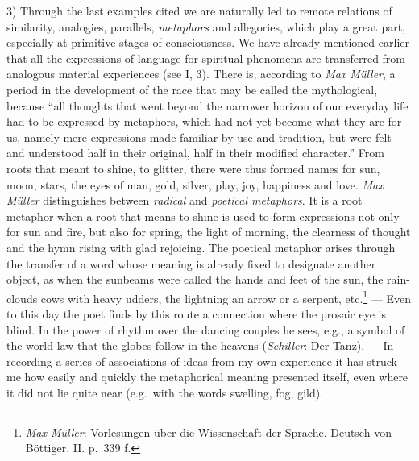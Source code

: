 \documentclass[12pt,a4paper]{book}
\newcommand{\opage}[1]{\marginnote{\footnotesize\textit{[#1]}}}
\begin{document}
3) Through the last examples cited we are naturally led to remote
relations of similarity, analogies, parallels, \emph{metaphors} and
allegories, which play a great part, especially at primitive stages of
consciousness. We have already mentioned earlier that all the expressions
of language for spiritual phenomena are transferred from analogous
material experiences (see I, 3). There is, according to \emph{Max Müller},
a period in the development of the race that may be called the
mythological, because ``all thoughts that went beyond the narrower horizon
of our everyday life had to be expressed by metaphors, which had not yet
become what they are for us, namely mere expressions made familiar by use
and tradition, but were felt and understood half in their original, half
in their modified character.'' From roots that meant to shine, to glitter,
there were thus formed names for sun, moon, stars, the eyes of man, gold,
silver, play, joy, happiness and love. \emph{Max Müller} distinguishes
between \emph{radical} and \emph{poetical metaphors}. It is a root
metaphor when a root that means to shine is used to form expressions not
only for sun and fire, but also for spring, the light of morning, the
clearness of thought and the hymn rising with glad rejoicing. The poetical
metaphor arises through the transfer of a word whose meaning is already
fixed to designate another object, as when the sunbeams were called the
hands and feet of the sun, the rain-clouds cows with heavy udders, the
lightning an arrow or a serpent, etc.\footnote{\emph{Max Müller}:
Vorlesungen über die Wissenschaft der Sprache. Deutsch von Böttiger. II.
p.~339 f.} --- Even to this day the poet finds by this route a connection
where the prosaic eye is blind. In the power of rhythm over the dancing
couples he sees, e.g., a symbol of the world-law that the globes follow in
the heavens (\emph{Schiller}: Der Tanz). --- In recording a series of
associations of ideas from my own
\opage{189}experience it has struck me how easily and quickly the
metaphorical meaning presented itself, even where it did not lie quite
near (e.g.\ with the words swelling, fog, gild).
\end{document}
